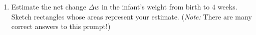 \documentclass[10pt]{article}
\begin{document}
    \quad
 \begin{minipage}[t][2in][t]{0.625\textwidth}
        \begin{enumerate}
        \item[(a)] Estimate the net change $\Delta w$ in the infant's weight from birth to $4$ weeks. Sketch rectangles whose areas represent your estimate. ({\it Note:} There are many correct answers to this prompt!)\\
        \end{enumerate}
    \end{minipage}
    ~\\\\\\
\end{document}
